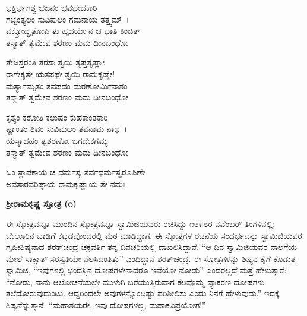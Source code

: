 
\begin{myquote}
ಭಕ್ತಿರ್ಭಗಶ್ಚ ಭಜನಂ ಭವಭೇದಕಾರಿ\\ಗಚ್ಛಂತ್ಯಲಂ ಸುವಿಪುಲಂ ಗಮನಾಯ ತತ್ತ್ವಮ್~।\\ವಕ್ತ್ರೋದ್ಧೃತೋಪಿ ತು ಹೃದಯೇ ನ ಚ ಭಾತಿ ಕಿಂಚಿತ್\\ತಸ್ಮಾತ್ ತ್ವಮೇವ ಶರಣಂ ಮಮ ದೀನಬಂಧೋ
\end{myquote}


\begin{myquote}
ತೇಜಸ್ತರಂತಿ ತರಸಾ ತ್ವಯಿ ತೃಪ್ತತೃಷ್ಣಾಃ\\ರಾಗೇಕೃತೇ ಋತಪಥೇ ತ್ವಯಿ ರಾಮಕೃಷ್ಣೇ!\\ಮರ್ತ್ಯಾಮೃತಂ ತವಪದಂ ಮರಣೋರ್ಮಿನಾಶಂ\\ತಸ್ಮಾತ್ ತ್ವಮೇವ ಶರಣಂ ಮಮ ದೀನಬಂಧೋ
\end{myquote}


\begin{myquote}
ಕೃತ್ಯಂ ಕರೋತಿ ಕಲುಷಂ ಕುಹಕಾಂತಕಾರಿ\\ಷ್ಣಾಂತಂ ಶಿವಂ ಸುವಿಮಲಂ ತವನಾಮ ನಾಥ~।\\ಯಸ್ಮಾದಹಂ ತ್ವಶರಣೋ ಜಗದೇಕಗಮ್ಯ\\ತಸ್ಮಾತ್ ತ್ವಮೇವ ಶರಣಂ ಮಮ ದೀನಬಂಧೋ
\end{myquote}


\delimiter

\begin{myquote}
ಓಂ ಸ್ಥಾಪಕಾಯ ಚ ಧರ್ಮಸ್ಯ ಸರ್ವಧರ್ಮಸ್ವರೂಪಿಣೇ\\ಅವತಾರವರಿಷ್ಠಾಯ ರಾಮಕೃಷ್ಣಾಯ ತೇ ನಮಃ
\end{myquote}

\begin{center}
\textbf{ಶ‍್ರೀರಾಮಕೃಷ್ಣ ಸ್ತೋತ್ರ (೧)}
\end{center}

ಈ ಸ್ತೋತ್ರವನ್ನೂ ಮುಂದಿನ ಸ್ತೋತ್ರವನ್ನೂ ಸ್ವಾಮಿಜಿಯವರು ರಚಿಸಿದ್ದು ೧೮೯೮ರ ನವೆಂಬರ್ ತಿಂಗಳಿನಲ್ಲಿ; ಬೇಲೂರಿನ ಬಾಡಿಗೆ ಕಟ್ಟಡವೊಂದರಲ್ಲಿ ಮಠ ಮಾಡಿದ್ದಾಗ. ಈ ಸ್ತೋತ್ರಗಳ ರಚನೆಯ ಸಂದರ್ಭವನ್ನು ಸ್ವಾಮಿಜಿಯವರ ಗೃಹೀಶಿಷ್ಯನಾದ ಶರತ್‌ಚಂದ್ರ ಚಕ್ರವರ್ತಿ ತನ್ನ ದಿನಚರಿಯಲ್ಲಿ ದಾಖಲಿಸಿದ್ದಾನೆ. “ಆ ದಿನ ಸ್ವಾಮಿಜಿಯವರ ನಾಲಗೆಯ ಮೇಲೆ ಸಾಕ್ಷಾತ್ ಸರಸ್ವತಿಯೇ ನೆಲಸಿದಂತಿತ್ತು” ಎಂದಿದ್ದಾನೆ ಶರತ್‌ಚಂದ್ರ. ಈ ಸ್ತೋತ್ರಗಳನ್ನು ಶಿಷ್ಯನ ಕೈಗೆ ಕೊಡುತ್ತ ಸ್ವಾಮಿಜಿ, “ಇವುಗಳಲ್ಲಿ ಛಂದಸ್ಸಿನ ದೋಷಗಳೇನಾದರೂ ಇವೆಯೋ ನೋಡು” ಎಂದರಲ್ಲದೆ ಮತ್ತೆ ಹೇಳುತ್ತಾರೆ: “ನೋಡು, ನಾನು ಆಲೋಚನೆಯಲ್ಲೇ ಮುಳುಗಿ ಬರೆಯುತ್ತಿರುವಾಗ ಕೆಲವೊಮ್ಮ ವ್ಯಾಕರಣ ದೋಷಗಳು ತಲೆದೋರುವುದುಂಟು. ಆದ್ದರಿಂದಲೇ ಅವುಗಳನ್ನೊಂದಿಷ್ಟು ಪರಿಶೀಲಿಸು ಎಂದು ನಿನಗೆ ಹೇಳುವುದು.” ಇದಕ್ಕೆ ಶಿಷ್ಯನೆನ್ನುತ್ತಾನೆ: “ಮಹಾಶಯರೇ, ಇವು ದೋಷಗಳಲ್ಲ, ಮಹಾಕವಿಪ್ರಯೋಗ!”

